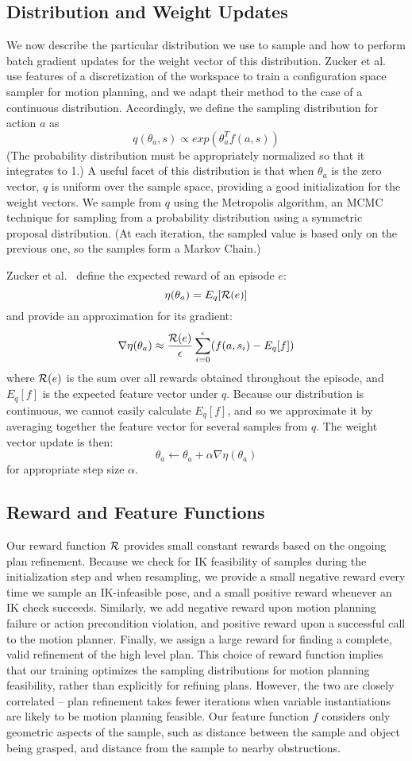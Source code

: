 \subsection{Distribution and Weight Updates}
We now describe the particular distribution we use to sample
and how to perform batch gradient updates for the weight vector of
this distribution. Zucker et al.~\cite{workspacebias} use features of a discretization of the workspace to train
a configuration space sampler for motion planning, and we adapt their
method to the case of a continuous distribution. Accordingly, we define the sampling distribution for
action $a$ as $$q(\theta_{a}, s) \propto exp(\theta_{a}^{T} f(a, s))$$
(The probability distribution must be appropriately normalized so
that it integrates to 1.) A useful facet of this distribution is
that when $\theta_{a}$ is the zero vector, $q$ is uniform over the
sample space, providing a good initialization for the weight
vectors. We sample from $q$ using the Metropolis algorithm,
an MCMC technique for sampling from a probability distribution using
a symmetric proposal distribution. (At each iteration, the sampled value
is based only on the previous one, so the samples form a Markov Chain.)

Zucker et al.~\cite{workspacebias} define the expected reward of an episode $e$:
$$\eta(\theta_{a}) = E_{q}[\mathcal{R}(e)]$$ and provide an approximation for its gradient:
$$\nabla \eta(\theta_{a}) \approx \frac{\mathcal{R}(e)}{\epsilon} \sum_{i=0}^{\epsilon}(f(a, s_{i}) - E_{q}[f])$$
where $\mathcal{R}(e)$ is the sum over all rewards obtained throughout the episode, and
$E_{q}[f]$ is the expected feature vector under $q$. Because our distribution
is continuous, we cannot easily calculate $E_{q}[f]$, and so we approximate it by averaging
together the feature vector for several samples from $q$. The weight vector update is then:
$$\theta_{a} \leftarrow \theta_{a} + \alpha \nabla \eta(\theta_{a})$$
for appropriate step size $\alpha$.

\subsection{Reward and Feature Functions}
Our reward function $\mathcal{R}$ provides small constant rewards based on the ongoing
plan refinement. Because we check for IK feasibility of samples during the initialization
step and when resampling, we provide a small negative reward every
time we sample an IK-infeasible pose, and a small positive reward whenever an IK check succeeds.
Similarly, we add negative reward upon motion planning failure or action precondition violation,
and positive reward upon a successful call to the motion planner. Finally, we assign
a large reward for finding a complete, valid refinement of the high level plan.
This choice of reward function implies that our training optimizes the sampling distributions for
motion planning feasibility, rather than explicitly for refining plans. However, the two are
closely correlated -- plan refinement takes fewer iterations when variable
instantiations are likely to be motion planning feasible. Our feature function $f$ considers only geometric
aspects of the sample, such as distance between the sample and object being grasped, and distance from
the sample to nearby obstructions.
